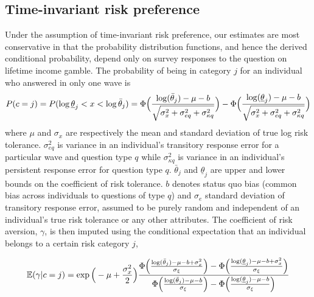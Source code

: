 \documentclass[emulatestandardclasses, 10pt, abstract = true]{scrartcl}
\begin{document}
\subsection{Time-invariant risk preference} \label{appendix-A}
Under the assumption of time-invariant risk preference, our estimates are most conservative in that the probability distribution functions, and hence the derived conditional probability, depend only on survey responses to the question on lifetime income gamble. The probability of being in category $j$ for an individual who answered in only one wave is 
\parskip 0cm
\begin{equation}
P(c=j)=P(\log\underline{\theta}_j<x<\log\bar{\theta}_j)=\Phi\Big({\log(\bar{\theta}_j)-\mu-b\over\sqrt{\sigma_x^2+\sigma_{eq}^2+\sigma_{\kappa q}^2}}\Big)-\Phi\Big({\log(\underline{\theta}_j)-\mu-b\over\sqrt{\sigma_x^2+\sigma_{eq}^2+\sigma_{\kappa q}^2}}\Big) 
\label{eq:A-likelihood-constant-univariate}	
\end{equation}
where $\mu$ and $\sigma_x$ are respectively the mean and standard deviation of true log risk tolerance. $\sigma_{eq}^2$ is variance in an individual's transitory response error for a particular wave and question type $q$ while $\sigma_{\kappa q}^2$ is variance in an individual's persistent response error for question type $q$. $\bar \theta_j$ and $\underline{\theta}_j$ are upper and lower bounds on the coefficient of risk tolerance. $b$ denotes status quo bias (common bias across individuals to questions of type $q$) and $\sigma_e$ standard deviation of transitory response error, assumed to be purely random and independent of an individual's true risk tolerance or any other attributes. The coefficient of risk aversion, $\gamma$, is then imputed using the conditional expectation that an individual belongs to a certain risk category $j$,

\begin{equation}
\mathbb E(\gamma|c=j)=\exp\Big(-\mu+{\sigma_x^2\over 2}\Big){\Phi\Big({\log(\bar{\theta}_j)-\mu-b+\sigma_x^2\over \sigma_{\xi}}\Big)-\Phi\Big({\log(\underline{\theta}_j)-\mu-b+\sigma_x^2\over \sigma_{\xi}}\Big)\over \Phi\Big({\log(\bar{\theta}_j)-\mu-b\over \sigma_\xi}\Big)-\Phi\Big({\log(\underline{\theta}_j)-\mu-b\over \sigma_\xi}\Big)}
\label{eq:A-conditional-expectation}
\end{equation}
\end{document}
